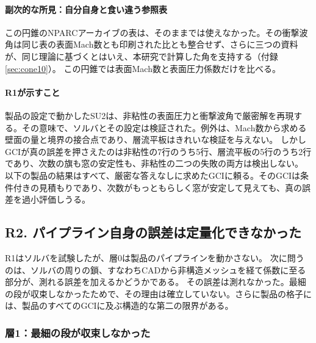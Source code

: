 \documentclass[twocolumn]{labreport}
\begin{document}
\paragraph{副次的な所見：自分自身と食い違う参照表}
この円錐のNPARCアーカイブの表\citep{nparc_cone10}は、そのままでは使えなかった。その衝撃波角は同じ表の表面Mach数とも印刷された比とも整合せず、さらに三つの資料が、同じ理論に基づくとはいえ、本研究で計算した角を支持する（付録\ref{sec:cone10}）。
この円錐では表面Mach数と表面圧力係数だけを比べる。

\paragraph{R1が示すこと}
製品の設定で動かしたSU2は、非粘性の表面圧力と衝撃波角で厳密解を再現する。その意味で、ソルバとその設定は検証された。例外は、Mach数から求める壁面の量と境界の接合点であり、層流平板はきれいな検証を与えない。
しかしGCIが真の誤差を押さえたのは非粘性の7行のうち5行、層流平板の5行のうち2行であり、次数の旗も窓の安定性も、非粘性の二つの失敗の両方は検出しない。
以下の製品の結果はすべて、厳密な答えなしに求めたGCIに頼る。そのGCIは条件付きの見積もりであり、次数がもっともらしく窓が安定して見えても、真の誤差を過小評価しうる。

\subsection{R2. パイプライン自身の誤差は定量化できなかった}
\label{sec:r2}

R1はソルバを試験したが、層0は製品のパイプラインを動かさない。
次に問うのは、ソルバの周りの鎖、すなわちCADから非構造メッシュを経て係数に至る部分が、測れる誤差を加えるかどうかである。
その誤差は測れなかった。最細の段が収束しなかったためで、その理由は確立していない。さらに製品の格子には、製品のすべてのGCIに及ぶ構造的な第二の限界がある。

\subsubsection{層1：最細の段が収束しなかった}
\label{sec:layer1}
\end{document}
